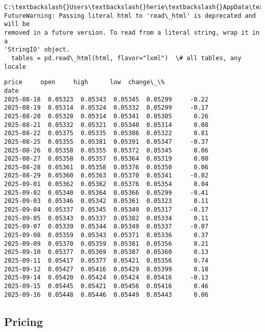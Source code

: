 \documentclass[10pt,a4paper]{article}
\makeatletter
\newcommand{\boxspacing}{\kern\kvtcb@left@rule\kern\kvtcb@boxsep}
\newcommand{\prompt}[4]{
        {\ttfamily\llap{{\color{#2}[#3]:\hspace{3pt}#4}}\vspace{-\baselineskip}}
    }
\makeatother
\begin{document}
    \begin{Verbatim}[commandchars=\\\{\}]
C:\textbackslash{}Users\textbackslash{}herie\textbackslash{}AppData\textbackslash{}Local\textbackslash{}Temp\textbackslash{}ipykernel\_21496\textbackslash{}338722890.py:11:
FutureWarning: Passing literal html to 'read\_html' is deprecated and will be
removed in a future version. To read from a literal string, wrap it in a
'StringIO' object.
  tables = pd.read\_html(html, flavor="lxml")  \# all tables, any locale
    \end{Verbatim}

            \begin{tcolorbox}[breakable, size=fbox, boxrule=.5pt, pad at break*=1mm, opacityfill=0]
\prompt{Out}{outcolor}{25}{\boxspacing}
\begin{Verbatim}[commandchars=\\\{\}]
              price     open     high      low  change\_\%
date
2025-08-18  0.05323  0.05343  0.05345  0.05299     -0.22
2025-08-19  0.05314  0.05324  0.05332  0.05299     -0.17
2025-08-20  0.05328  0.05314  0.05341  0.05305      0.26
2025-08-21  0.05332  0.05321  0.05340  0.05314      0.08
2025-08-22  0.05375  0.05335  0.05386  0.05322      0.81
2025-08-25  0.05355  0.05381  0.05391  0.05347     -0.37
2025-08-26  0.05358  0.05355  0.05372  0.05345      0.06
2025-08-27  0.05358  0.05357  0.05364  0.05319      0.00
2025-08-28  0.05361  0.05358  0.05376  0.05350      0.06
2025-08-29  0.05360  0.05363  0.05370  0.05341     -0.02
2025-09-01  0.05362  0.05362  0.05376  0.05354      0.04
2025-09-02  0.05340  0.05364  0.05366  0.05299     -0.41
2025-09-03  0.05346  0.05342  0.05361  0.05323      0.11
2025-09-04  0.05337  0.05345  0.05349  0.05317     -0.17
2025-09-05  0.05343  0.05337  0.05382  0.05334      0.11
2025-09-07  0.05339  0.05344  0.05349  0.05337     -0.07
2025-09-08  0.05359  0.05343  0.05371  0.05336      0.37
2025-09-09  0.05370  0.05359  0.05381  0.05356      0.21
2025-09-10  0.05377  0.05369  0.05387  0.05360      0.13
2025-09-11  0.05417  0.05377  0.05421  0.05356      0.74
2025-09-12  0.05427  0.05416  0.05429  0.05399      0.18
2025-09-14  0.05420  0.05424  0.05424  0.05416     -0.13
2025-09-15  0.05445  0.05421  0.05456  0.05416      0.46
2025-09-16  0.05448  0.05446  0.05449  0.05443      0.06
\end{Verbatim}
\end{tcolorbox}
        
    \hypertarget{pricing}{%
\subsection{Pricing}\label{pricing}}
\end{document}
